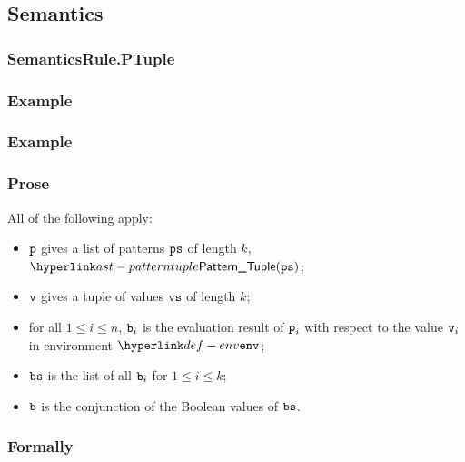 \subsection{Semantics}
\subsubsection{SemanticsRule.PTuple \label{sec:SemanticsRule.PTuple}}
\subsubsection{Example}

\subsubsection{Example}

\subsubsection{Prose}
All of the following apply:
\begin{itemize}
  \item $\vp$ gives a list of patterns $\vps$ of length $k$, $\PatternTuple(\vps)$;
  \item $\vv$ gives a tuple of values $\vvs$ of length $k$;
  \item for all $1 \leq i \leq n$, $\vb_i$ is the evaluation result
    of $\vp_i$ with respect to the value $\vv_i$ in
    environment $\env$;
  \item $\vbs$ is the list of all $\vb_i$ for $1 \leq i \leq k$;
  \item $\vb$ is the conjunction of the Boolean values of $\vbs$.
\end{itemize}
\subsubsection{Formally}
\begin{mathpar}
\end{mathpar}

